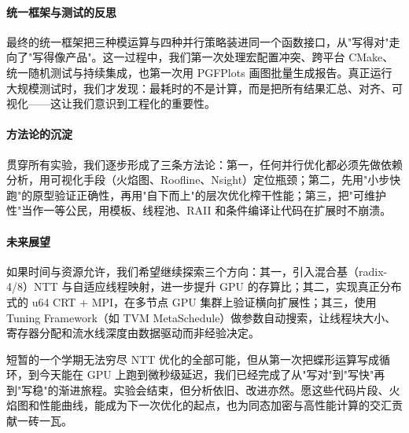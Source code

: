 \documentclass[a4paper]{article}
\begin{document}
\paragraph{统一框架与测试的反思} 最终的统一框架把三种模运算与四种并行策略装进同一个函数接口，从"写得对"走向了"写得像产品"。这一过程中，我们第一次处理宏配置冲突、跨平台 CMake、统一随机测试与持续集成，也第一次用 PGFPlots 画图批量生成报告。真正运行大规模测试时，我们才发现：最耗时的不是计算，而是把所有结果汇总、对齐、可视化——这让我们意识到工程化的重要性。

\paragraph{方法论的沉淀} 贯穿所有实验，我们逐步形成了三条方法论：第一，任何并行优化都必须先做依赖分析，用可视化手段（火焰图、Roofline、Nsight）定位瓶颈；第二，先用"小步快跑"的原型验证正确性，再用"自下而上"的层次优化榨干性能；第三，把"可维护性"当作一等公民，用模板、线程池、RAII 和条件编译让代码在扩展时不崩溃。

\paragraph{未来展望} 如果时间与资源允许，我们希望继续探索三个方向：其一，引入混合基（radix-​4/8）NTT 与自适应线程映射，进一步提升 GPU 的存算比；其二，实现真正分布式的 u64 CRT + MPI，在多节点 GPU 集群上验证横向扩展性；其三，使用 Tuning Framework（如 TVM MetaSchedule）做参数自动搜索，让线程块大小、寄存器分配和流水线深度由数据驱动而非经验决定。

短暂的一个学期无法穷尽 NTT 优化的全部可能，但从第一次把蝶形运算写成循环，到今天能在 GPU 上跑到微秒级延迟，我们已经完成了从"写对"到"写快"再到"写稳"的渐进旅程。实验会结束，但分析依旧、改进亦然。愿这些代码片段、火焰图和性能曲线，能成为下一次优化的起点，也为同态加密与高性能计算的交汇贡献一砖一瓦。
\end{document}
